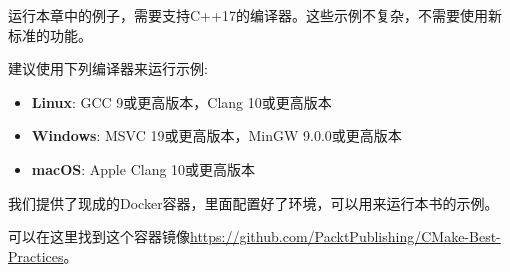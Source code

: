 运行本章中的例子，需要支持C++17的编译器。这些示例不复杂，不需要使用新标准的功能。

建议使用下列编译器来运行示例:

\begin{itemize}
\item \textbf{Linux}: GCC 9或更高版本，Clang 10或更高版本
\item \textbf{Windows}: MSVC 19或更高版本，MinGW 9.0.0或更高版本
\item \textbf{macOS}: Apple Clang 10或更高版本
\end{itemize}

\begin{tcolorbox}[colback=webgreen!5!white,colframe=webgreen!75!black,title=Note]
我们提供了现成的Docker容器，里面配置好了环境，可以用来运行本书的示例。

可以在这里找到这个容器镜像\url{https://github.com/PacktPublishing/CMake-Best-Practices}。
\end{tcolorbox}